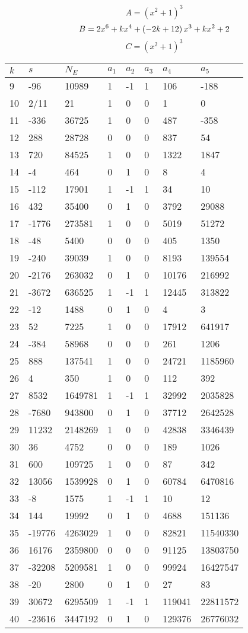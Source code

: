 \documentclass{amsart}
\begin{document}
$$A=(x^2
 + 1)^{3}$$
$$B=2\*x^6
 + k\*x^4
 + \left(-2\*k
 + 12\right) \*x^3
 + k\*x^2
 + 2$$
$$C=(x^2
 + 1)^{3}$$
\begin{longtable}{|l|l|l|lllll|}
\hline
$k$ & $s$ & $N_E$ & $a_1$ & $a_2$ & $a_3$ & $a_4$ & $a_5$\\
\hline
9&-96&10989&1&-1&1&106&-188\\
10&2/11&21&1&0&0&1&0\\
11&-336&36725&1&0&0&487&-358\\
12&288&28728&0&0&0&837&54\\
13&720&84525&1&0&0&1322&1847\\
14&-4&464&0&1&0&8&4\\
15&-112&17901&1&-1&1&34&10\\
16&432&35400&0&1&0&3792&29088\\
17&-1776&273581&1&0&0&5019&51272\\
18&-48&5400&0&0&0&405&1350\\
19&-240&39039&1&0&0&8193&139554\\
20&-2176&263032&0&1&0&10176&216992\\
21&-3672&636525&1&-1&1&12445&313822\\
22&-12&1488&0&1&0&4&3\\
23&52&7225&1&0&0&17912&641917\\
24&-384&58968&0&0&0&261&1206\\
25&888&137541&1&0&0&24721&1185960\\
26&4&350&1&0&0&112&392\\
27&8532&1649781&1&-1&1&32992&2035828\\
28&-7680&943800&0&1&0&37712&2642528\\
29&11232&2148269&1&0&0&42838&3346439\\
30&36&4752&0&0&0&189&1026\\
31&600&109725&1&0&0&87&342\\
32&13056&1539928&0&1&0&60784&6470816\\
33&-8&1575&1&-1&1&10&12\\
34&144&19992&0&1&0&4688&151136\\
35&-19776&4263029&1&0&0&82821&11540330\\
36&16176&2359800&0&0&0&91125&13803750\\
37&-32208&5209581&1&0&0&99924&16427547\\
38&-20&2800&0&1&0&27&83\\
39&30672&6295509&1&-1&1&119041&22811572\\
40&-23616&3447192&0&1&0&129376&26776032\\

\end{longtable}
\end{document}
